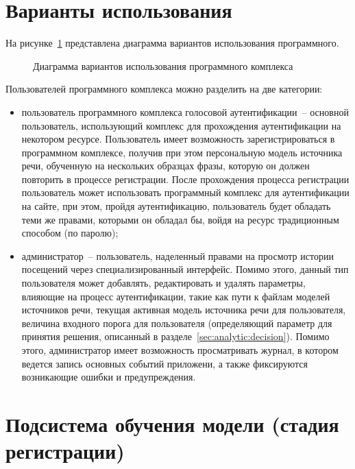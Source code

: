 \section{Варианты использования}

На рисунке~\ref{fig:use_cases} представлена диаграмма вариантов использования программного.

\begin{figure}[htp!]
    \caption{Диаграмма вариантов использования программного комплекса}
    \label{fig:use_cases}
\end{figure}

Пользователей программного комплекса можно разделить на две категории:
\begin{itemize}
\item пользователь программного комплекса голосовой аутентификации~-- основной пользователь, использующий
комплекс для прохождения аутентификации на некотором ресурсе. Пользователь имеет
возможность зарегистрироваться в программном комплексе, получив при этом персональную модель
источника речи, обученную на нескольких образцах фразы, которую он должен
повторить в процессе регистрации. После прохождения процесса регистрации
пользователь может использовать программный комплекс для аутентификации на сайте, при этом,
пройдя аутентификацию, пользователь будет обладать теми же правами, которыми он
обладал бы, войдя на ресурс традиционным способом (по паролю);
\item администратор~-- пользователь, наделенный правами на просмотр истории посещений через специализированный интерфейс. Помимо этого, данный тип пользователя может добавлять, редактировать и удалять параметры, влияющие на процесс аутентификации, такие как пути к файлам моделей источников речи, текущая активная модель источника речи для пользователя, величина входного порога для пользователя (определяющий параметр для принятия решения, описанный в разделе~\ref{sec:analytic:decision}). Помимо этого, администратор имеет возможность просматривать журнал, в котором ведется запись основных событий приложени, а также фиксируются возникающие ошибки и предупреждения.
\end{itemize}

\section{Подсистема обучения модели (стадия регистрации)}
\label{sec:construct:enrollment}

